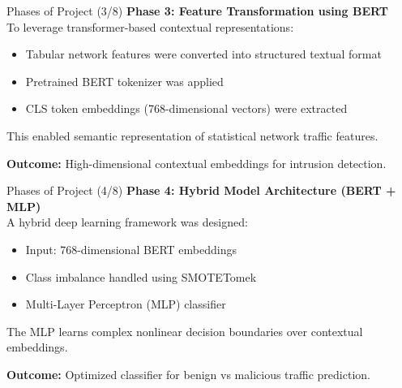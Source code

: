\documentclass[aspectratio=169,xcolor=dvipsnames]{beamer}
\begin{document}

\begin{frame}{Phases of Project (3/8)}
\textbf{Phase 3: Feature Transformation using BERT} \\[6pt]

To leverage transformer-based contextual representations:

\begin{itemize}
    \item Tabular network features were converted into structured textual format
    \item Pretrained BERT tokenizer was applied
    \item CLS token embeddings (768-dimensional vectors) were extracted
\end{itemize}

This enabled semantic representation of statistical network traffic features.

\vspace{0.2cm}
\textbf{Outcome:}
High-dimensional contextual embeddings for intrusion detection.
\end{frame}



\begin{frame}{Phases of Project (4/8)}
\textbf{Phase 4: Hybrid Model Architecture (BERT + MLP)} \\[6pt]

A hybrid deep learning framework was designed:

\begin{itemize}
    \item Input: 768-dimensional BERT embeddings
    \item Class imbalance handled using SMOTETomek
    \item Multi-Layer Perceptron (MLP) classifier
\end{itemize}

The MLP learns complex nonlinear decision boundaries over contextual embeddings.

\vspace{0.2cm}
\textbf{Outcome:}
Optimized classifier for benign vs malicious traffic prediction.
\end{frame}


\end{document}
